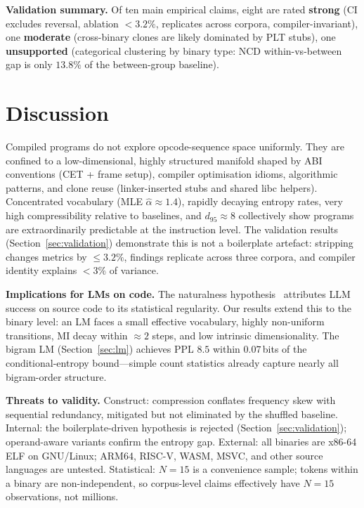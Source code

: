 \documentclass[conference]{IEEEtran}
\begin{document}
\textbf{Validation summary.}
Of ten main empirical claims, eight are rated \textbf{strong}
(CI excludes reversal, ablation $<3.2\%$, replicates across corpora,
compiler-invariant), one \textbf{moderate} (cross-binary clones are
likely dominated by PLT stubs), one \textbf{unsupported} (categorical
clustering by binary type: NCD within-vs-between gap is only $13.8\%$
of the between-group baseline).

\section{Discussion}
\label{sec:discussion}

Compiled programs do not explore opcode-sequence space uniformly.  They
are confined to a low-dimensional, highly structured manifold shaped by
ABI conventions (CET + frame setup), compiler optimisation idioms,
algorithmic patterns, and clone reuse (linker-inserted stubs and shared
libc helpers).  Concentrated vocabulary
(MLE $\hat{\alpha}{\approx}1.4$), rapidly decaying entropy rates, very
high compressibility relative to baselines, and $d_{95}{\approx}8$
collectively show programs are extraordinarily predictable at the
instruction level.  The validation results
(Section~\ref{sec:validation}) demonstrate this is not a boilerplate
artefact: stripping changes metrics by ${\leq}3.2\%$, findings replicate
across three corpora, and compiler identity explains ${<}3\%$ of variance.

\textbf{Implications for LMs on code.}
The naturalness hypothesis~\cite{hindle2012naturalness} attributes LLM
success on source code to its statistical regularity.  Our results
extend this to the binary level: an LM faces a small effective
vocabulary, highly non-uniform transitions, MI decay within ${\approx}2$
steps, and low intrinsic dimensionality.  The bigram LM
(Section~\ref{sec:lm}) achieves PPL $8.5$ within $0.07$\,bits of the
conditional-entropy bound---simple count statistics already capture
nearly all bigram-order structure.

\textbf{Threats to validity.}
Construct: compression conflates frequency skew with sequential
redundancy, mitigated but not eliminated by the shuffled baseline.
Internal: the boilerplate-driven hypothesis is rejected
(Section~\ref{sec:validation}); operand-aware variants confirm the
entropy gap.
External: all binaries are x86-64 ELF on GNU/Linux; ARM64, RISC-V,
WASM, MSVC, and other source languages are untested.
Statistical: $N{=}15$ is a convenience sample; tokens within a binary
are non-independent, so corpus-level claims effectively have $N{=}15$
observations, not millions.
\end{document}
